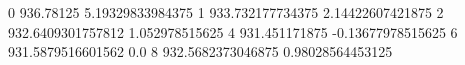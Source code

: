 0 936.78125 5.19329833984375
1 933.732177734375 2.14422607421875
2 932.6409301757812 1.052978515625
4 931.451171875 -0.13677978515625
6 931.5879516601562 0.0
8 932.5682373046875 0.98028564453125
